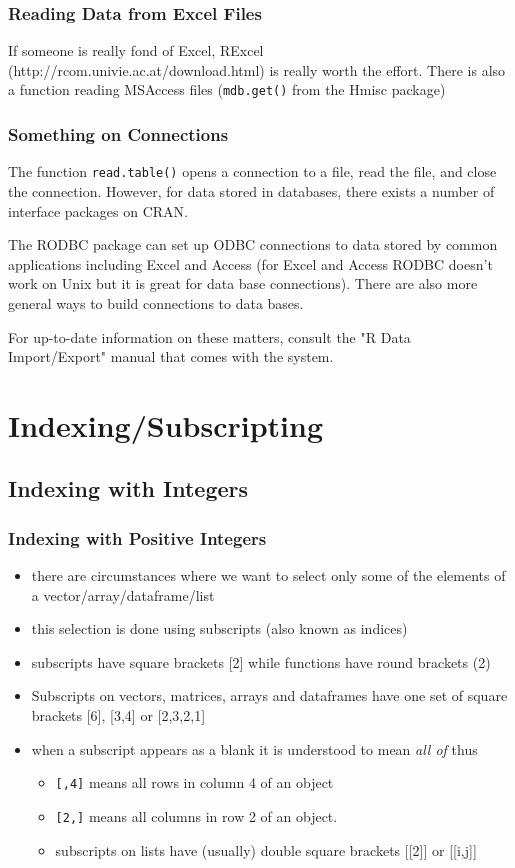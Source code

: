\documentclass[xcolor={table},c]{beamer}
\begin{document}
\begin{frame}[fragile]\frametitle{Reading Data from Excel Files}
If someone is really fond of Excel, RExcel (http://rcom.univie.ac.at/download.html) is really worth the effort. There is also a function reading MSAccess files (\texttt{mdb.get()} from the Hmisc package)
\end{frame}

\begin{frame}\frametitle{Something on Connections}
The function \texttt{read.table()} opens a connection to a file, read the file, and close the connection. However, for data stored in databases, there exists a number of interface packages on CRAN. 

The RODBC package can set up ODBC connections to data stored by common applications including Excel and Access (for Excel and Access RODBC doesn't work on Unix but it is great for data base connections). There are also more general ways to build connections to data bases.

For up-to-date information on these matters, consult the "R Data Import/Export" manual that comes with the system.
\end{frame}

\section{Indexing/Subscripting}
\subsection{Indexing with Integers}
\begin{frame}[fragile]\frametitle{Indexing with Positive Integers} %
\begin{itemize}
\item there are circumstances where we want to select only some of the elements of a vector/array/dataframe/list
\item this selection is done using subscripts (also known as indices)
\item subscripts have square brackets [2] while functions have round brackets (2)
\item Subscripts on vectors, matrices, arrays and dataframes have one set of square brackets [6], [3,4] or [2,3,2,1]
\item when a subscript appears as a blank it is understood to mean \emph{all of} thus
\begin{itemize}
\item \verb+[,4]+ means all rows in column 4 of an object
\item \verb+[2,]+ means all columns in row 2 of an object.
\item subscripts on lists have (usually) double square brackets [[2]] or [[i,j]]
\end{itemize}

\end{itemize}
\end{frame}
\end{document}
